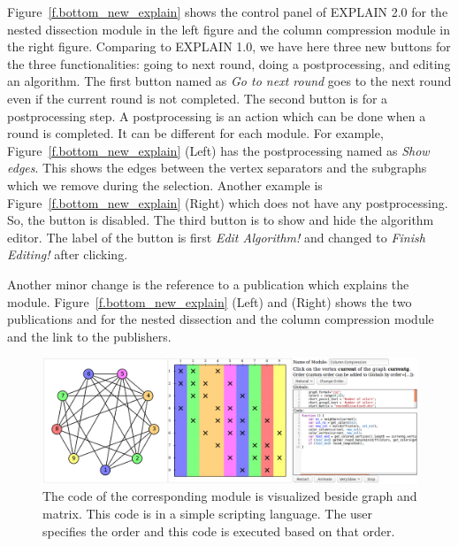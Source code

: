 \documentclass[12pt, twoside,a4paper,toc=bibliography]{scrbook}
\begin{document}
Figure~\ref{f.bottom_new_explain} shows the control panel of EXPLAIN 2.0 for the 
nested dissection module in the left figure and the column compression
module in the right figure. 
Comparing to EXPLAIN 1.0, we have here three new buttons for the three functionalities:
going to next round, doing a postprocessing, and editing an algorithm.
The first button named as \textit{Go to next round} goes to the next round even if 
the current round is not completed. The second button is for a postprocessing
step. A postprocessing is an action which can be done when a round is completed.
It can be different for each module.
For example, Figure~\ref{f.bottom_new_explain} (Left) has the postprocessing named
as \textit{Show edges}. This shows the edges between the vertex separators
and the subgraphs which we remove during the selection.
Another example is Figure~\ref{f.bottom_new_explain} (Right) which does not have
any postprocessing. So, the button is disabled.
The third button is to show and hide the algorithm editor.
The label of the button is first \textit{Edit Algorithm!}
and changed to \textit{Finish Editing!} after clicking.

Another minor change is the reference to a publication which explains the 
module. Figure~\ref{f.bottom_new_explain} (Left) and (Right) shows the two publications
\cite{2013:05} and \cite{2014:02} for the nested dissection and the column compression module
and the link to the publishers.
\begin{figure}
\centering
\includegraphics[width=\textwidth]{custom_module}
\caption{The code of the corresponding module is visualized beside
graph and matrix. This code is in a simple scripting language.
The user specifies the order and this code is executed based on that order.}
\label{f.custom_module}
\end{figure}
\end{document}
